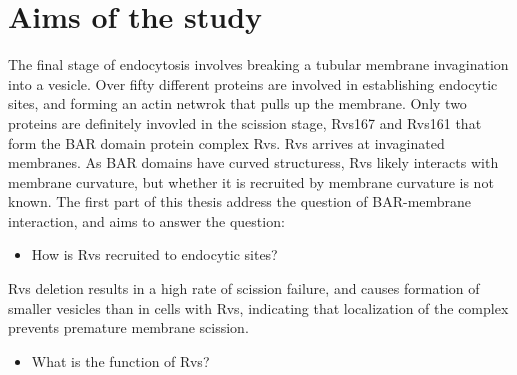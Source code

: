
\chapter{Aims of the study} %

\label{Ch:Aims} %

The final stage of endocytosis involves breaking a tubular membrane invagination into a vesicle. Over fifty different proteins are involved in establishing endocytic sites, and forming an actin netwrok that pulls up the membrane. Only two proteins are  definitely invovled in the scission stage, Rvs167 and Rvs161 that form the  BAR domain protein complex Rvs. Rvs arrives at invaginated membranes. As BAR domains have curved structuress, Rvs likely interacts with membrane curvature, but whether it is recruited by membrane curvature is not known. The first part of this thesis address the question of BAR-membrane interaction, and aims to answer the question:


\begin{itemize}
	\item How is Rvs recruited to endocytic sites? 
\end{itemize}

Rvs deletion results in a high rate of scission failure, and causes formation of smaller vesicles than in cells with Rvs, indicating that localization of the complex prevents premature membrane scission. 

\begin{itemize}
	\item What is the function of Rvs?
\end{itemize}